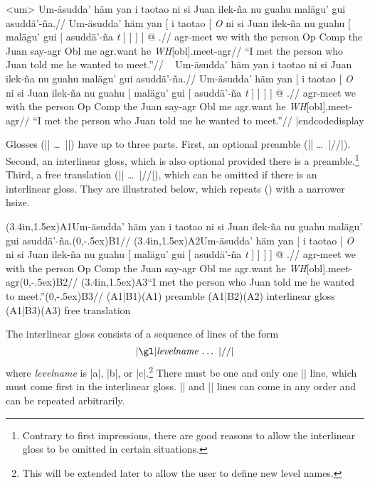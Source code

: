 \framedisplay
\ex<um>
\begingl
\glpreamble Um-\"asudda' h\"am yan i taotao ni si Juan
ilek-\~na nu guahu mal\"agu' gui
asudd\"a'-\~na.//
\gla Um-\"asudda' h\"am yan [ i taotao [ {\it O\/} ni si Juan
ilek-\~na nu guahu [ mal\"agu' gui [ asudd\"a'-\~na {\it
t\/} ] ] ] ] @ .//
\glb agr-meet we with the person Op Comp the Juan say-agr Obl me
agr.want he {\it WH\/}[obl].meet-agr//
\glft ``I met the person who Juan told me he wanted to
meet.''//
\endgl
\xe
\endframedisplay
\codedisplay~
\ex
\begingl
\glpreamble Um-\"asudda' h\"am yan i taotao ni si Juan
   ilek-\~na nu guahu mal\"agu' gui asudd\"a'-\~na.//
\gla Um-\"asudda' h\"am yan [ i taotao [ {\it O\/} ni si Juan
   ilek-\~na nu guahu [ mal\"agu' gui [ asudd\"a'-\~na {\it
   t\/} ] ] ] ] @ .//
\glb agr-meet we with the person Op Comp the Juan say-agr Obl me
   agr.want he {\it WH\/}[obl].meet-agr//
\glft ``I met the person who Juan told me he wanted to
   meet.''//
\endgl
\xe
|endcodedisplay

Glosses (|\begingl| \dots\ |\endgl|) have up to three
parts.  First, an optional preamble (|\glpreamble| \dots\ |//|).
Second, an interlinear gloss, which is also optional provided there is
a preamble.\footnote{%
Contrary to first impressions, there are good reasons to allow the
interlinear gloss to be omitted in certain situations.}  Third, a free
translation (|\glft| \dots\ |//|), which can be omitted if there is an
interlinear gloss. They are illustrated below, which repeats (\lastx)
with a narrower hsize.

\begingroup

\ex%
\def\TOP{\pnode(3.4in,1.5ex)}%
\def\BOT{\pnode(0,-.5ex)}%
\begingl[glwidth=3.2in]
\glpreamble \TOP{A1}Um-\"asudda' h\"am yan i taotao ni si Juan
ilek-\~na nu guahu mal\"agu' gui
asudd\"a'-\~na.\BOT{B1}//
\gla \TOP{A2}Um-\"asudda' h\"am yan [ i taotao [ {\it O\/} ni si Juan
ilek-\~na nu guahu [ mal\"agu' gui [ asudd\"a'-\~na {\it
t\/} ] ] ] ] @ .//
\glb agr-meet we with the person Op Comp the Juan say-agr Obl me
agr.want he {\it WH\/}[obl].meet-agr\BOT{B2}//
\glft \TOP{A3}``I met the person who Juan told me he wanted to
meet.''\BOT{B3}//
\endgl
\SpecialCoor
\psbrace[ref=lC](A1|B1)(A1){ preamble}
\psbrace[ref=lC](A1|B2)(A2){ interlinear gloss}
\psbrace[ref=lC](A1|B3)(A3){ free translation}
\xe
\endgroup

The interlinear gloss consists of a sequence of lines of the form
$$\hbox{|\gl|{\it levelname\/} \dots\ |//|}$$
where {\it levelname\/} is |a|, |b|, or |c|.\footnote{%
This will be extended later to allow the user to define new level
names.}  There must be one and only one |\gla| line, which must come
first in the interlinear gloss. |\glb| and |\glc| lines can come in
any order and can be repeated arbitrarily.

